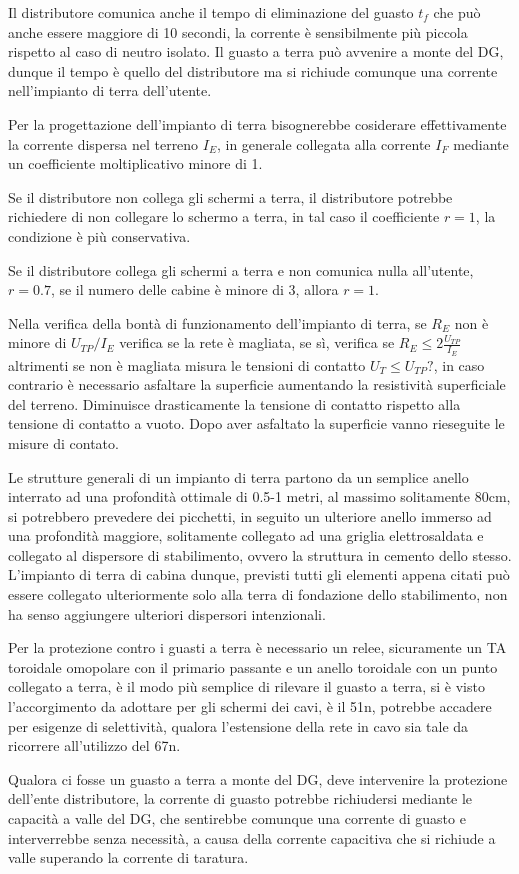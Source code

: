 Il distributore comunica anche il tempo di eliminazione del guasto $t_f$ che può anche essere maggiore di 10 secondi, la corrente è sensibilmente più piccola rispetto al caso di neutro isolato. Il guasto a terra può avvenire a monte del DG, dunque il tempo è quello del distributore ma si richiude comunque una corrente nell'impianto di terra dell'utente.


Per la progettazione dell'impianto di terra bisognerebbe cosiderare effettivamente la corrente dispersa nel terreno $I_E$, in generale collegata alla corrente $I_F$ mediante un coefficiente moltiplicativo minore di 1.

Se il distributore non collega gli schermi a terra, il distributore potrebbe richiedere di non collegare lo schermo a terra, in tal caso il coefficiente $r=1$, la condizione è più conservativa.

Se il distributore collega gli schermi a terra e non comunica nulla all'utente, $r=0.7$, se il numero delle cabine è minore di 3, allora $r=1$.

Nella verifica della bontà di funzionamento dell'impianto di terra, se $R_E$ 
non è minore di $U_{TP}/I_E$ verifica se la rete è magliata, se sì, verifica se 
$R_E\leq 2\frac{U_{TP}}{I_E}$ altrimenti se non è magliata misura le tensioni 
di contatto $U_{T} \leq U_{TP}?$, in caso contrario è necessario asfaltare la 
superficie aumentando la resistività superficiale del terreno. Diminuisce 
drasticamente la tensione di contatto rispetto alla tensione di contatto a 
vuoto.
Dopo aver asfaltato la superficie vanno rieseguite le misure di contato.

Le strutture generali di un impianto di terra partono da un semplice anello  
interrato ad una profondità ottimale di 0.5-1 metri, al massimo solitamente 
80cm, si potrebbero prevedere dei picchetti, in seguito un ulteriore anello 
immerso ad una profondità maggiore, solitamente collegato ad una griglia 
elettrosaldata e collegato al dispersore di stabilimento, ovvero la struttura 
in cemento dello stesso. L'impianto di terra di cabina dunque, previsti tutti 
gli elementi appena citati può essere collegato ulteriormente solo alla terra 
di fondazione dello stabilimento, non ha senso aggiungere ulteriori dispersori 
intenzionali.

Per la protezione contro i guasti a terra è necessario un relee, sicuramente un 
TA toroidale omopolare con il primario passante e un anello toroidale con un 
punto collegato a terra, è il modo più semplice di rilevare il guasto a terra, 
si è visto l'accorgimento da adottare per gli schermi dei cavi, è il 51n, 
potrebbe accadere per esigenze di selettività, qualora l'estensione della rete 
in cavo sia tale da ricorrere all'utilizzo del 67n.

Qualora ci fosse un guasto a terra a monte del DG, deve intervenire la 
protezione dell'ente distributore, la corrente di guasto potrebbe richiudersi 
mediante le capacità a valle del DG, che sentirebbe comunque una corrente di 
guasto e interverrebbe senza necessità, a causa della corrente capacitiva che 
si richiude a valle superando la corrente di taratura.

